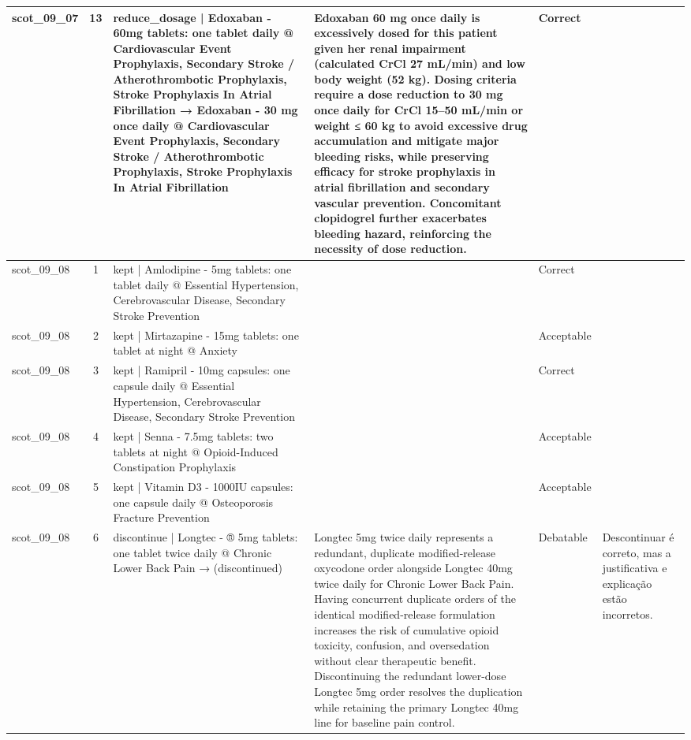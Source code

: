 \begin{longtable}{|p{1.45cm}|c|p{3.3cm}|p{6.5cm}|p{1.55cm}|p{2.3cm}|}
\hline
scot\_09\_07 & 13 & reduce\_dosage | Edoxaban - 60mg tablets: one tablet daily @ Cardiovascular Event Prophylaxis, Secondary Stroke / Atherothrombotic Prophylaxis, Stroke Prophylaxis In Atrial Fibrillation → Edoxaban - 30 mg once daily @ Cardiovascular Event Prophylaxis, Secondary Stroke / Atherothrombotic Prophylaxis, Stroke Prophylaxis In Atrial Fibrillation & Edoxaban 60 mg once daily is excessively dosed for this patient given her renal impairment (calculated CrCl 27 mL/min) and low body weight (52 kg). Dosing criteria require a dose reduction to 30 mg once daily for CrCl 15–50 mL/min or weight ≤ 60 kg to avoid excessive drug accumulation and mitigate major bleeding risks, while preserving efficacy for stroke prophylaxis in atrial fibrillation and secondary vascular prevention. Concomitant clopidogrel further exacerbates bleeding hazard, reinforcing the necessity of dose reduction. & Correct &  \\
\hline
scot\_09\_08 & 1 & kept | Amlodipine - 5mg tablets: one tablet daily @ Essential Hypertension, Cerebrovascular Disease, Secondary Stroke Prevention &  & Correct &  \\
\hline
scot\_09\_08 & 2 & kept | Mirtazapine - 15mg tablets: one tablet at night @ Anxiety &  & Acceptable &  \\
\hline
scot\_09\_08 & 3 & kept | Ramipril - 10mg capsules: one capsule daily @ Essential Hypertension, Cerebrovascular Disease, Secondary Stroke Prevention &  & Correct &  \\
\hline
scot\_09\_08 & 4 & kept | Senna - 7.5mg tablets: two tablets at night @ Opioid-Induced Constipation Prophylaxis &  & Acceptable &  \\
\hline
scot\_09\_08 & 5 & kept | Vitamin D3 - 1000IU capsules: one capsule daily @ Osteoporosis Fracture Prevention &  & Acceptable &  \\
\hline
scot\_09\_08 & 6 & discontinue | Longtec - ® 5mg tablets: one tablet twice daily @ Chronic Lower Back Pain → (discontinued) & Longtec 5mg twice daily represents a redundant, duplicate modified-release oxycodone order alongside Longtec 40mg twice daily for Chronic Lower Back Pain. Having concurrent duplicate orders of the identical modified-release formulation increases the risk of cumulative opioid toxicity, confusion, and oversedation without clear therapeutic benefit. Discontinuing the redundant lower-dose Longtec 5mg order resolves the duplication while retaining the primary Longtec 40mg line for baseline pain control. & Debatable & Descontinuar é correto, mas a justificativa e explicação estão incorretos. \\

\end{longtable}
